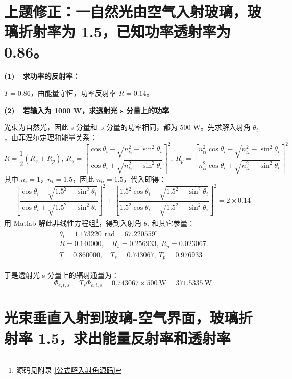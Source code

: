 \documentclass[UTF8]{report}
\theoremstyle{MyLineTheoremStyle} %
\theoremstyle{MyBlockTheoremStyle} %
\theoremstyle{MySubsubsectionStyle} %
\begin{document}
\section{上题修正：一自然光由空气入射玻璃，玻璃折射率为 1.5，已知功率透射率为 0.86。}
\textbf{(1)\ \ 求功率的反射率：}

$T = 0.86$，由能量守恒，功率反射率 $R = 0.14$。

\textbf{(2)\ \ 若输入为 1000 W，求透射光 s 分量上的功率}

光束为自然光，因此 s 分量和 p 分量的功率相同，都为 500 W。先求解入射角 $\theta_i$，由菲涅尔定理和能量关系：
\begin{equation}
R =  \frac{1}{2}(R_s + R_p),\  R_s =  \left[ \frac{ \cos \theta_i - \sqrt{n_{ti}^2 - \sin^2 \theta_i} }{\cos \theta_i + \sqrt{n_{ti}^2 - \sin^2 \theta_i}} \right]^2,\ R_p = \left[ \frac{ n_{ti}^2\cos \theta_i - \sqrt{n_{ti}^2 - \sin^2 \theta_i} }{n_{ti}^2\cos \theta_i + \sqrt{n_{ti}^2 - \sin^2 \theta_i}} \right]^2
\end{equation}
其中 $n_i = 1$，$n_t = 1.5$，因此 $n_{ti} = 1.5$，代入即得：
\begin{equation}
    \left[ \frac{ \cos \theta_i - \sqrt{1.5^2 - \sin^2 \theta_i} }{\cos \theta_i + \sqrt{1.5^2 - \sin^2 \theta_i}} \right]^2 + \left[ \frac{ 1.5^2\cos \theta_i - \sqrt{1.5^2 - \sin^2 \theta_i} }{1.5^2\cos \theta_i + \sqrt{1.5^2 - \sin^2 \theta_i}} \right]^2 = 2\times0.14
\end{equation}
用 Matlab 解此非线性方程组\footnote{源码见附录 \ref{公式解入射角源码}}，得到入射角 $\theta_i$ 和其它参量：
\begin{gather}\label{解入射角}
\begin{matrix}
    \theta_i =  1.173220\ \ \mathrm{rad}  = 67.220559^\circ \\
    R = 0.140000,\quad   R_s = 0.256933,\    R_p = 0.023067 \\ 
    T = 0.860000,\quad   T_s = 0.743067,\    T_p = 0.976933
\end{matrix}
\end{gather}

于是透射光 s 分量上的辐射通量为：
\begin{equation}
\Phi_{e,t,s} = T_s \Phi_{e,i,s} = 0.743067 \times 500 \ \mathrm{W} =  371.5335 \ \mathrm{W}
\end{equation}


\section{光束垂直入射到玻璃-空气界面，玻璃折射率 1.5，求出能量反射率和透射率}
\end{document}
